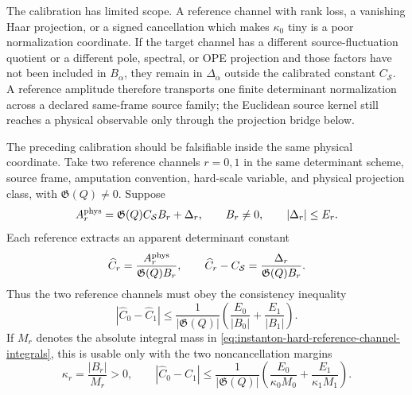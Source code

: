 \begin{controlledapproximation}
The calibration has limited scope.  A reference channel with rank loss, a
vanishing Haar projection, or a signed cancellation which makes \(\kappa_0\)
tiny is a poor normalization coordinate.  If the target channel has a
different source-fluctuation quotient or a different pole, spectral, or OPE
projection and those factors have not been included in \(B_\alpha\), they
remain in \(\Delta_\alpha\) outside the calibrated constant \(C_{\mathcal S}\).
A reference amplitude therefore transports one finite determinant
normalization across a declared same-frame source family; the Euclidean source
kernel still reaches a physical observable only through the projection bridge
below.
\end{controlledapproximation}

\begin{controlledapproximation}
\label{ca:instanton-overdetermined-reference-channel-calibration}
The preceding calibration should be falsifiable inside the same physical
coordinate.  Take two reference channels \(r=0,1\) in the same determinant
scheme, source frame, amputation convention, hard-scale variable, and physical
projection class, with \(\mathfrak G(Q)\ne0\).  Suppose
\begin{equation}
  A_r^{\rm phys}
  =
  \mathfrak G(Q)C_{\mathcal S}B_r+\Delta_r,
  \qquad
  B_r\ne0,\qquad
  |\Delta_r|\le E_r .
  \label{eq:instanton-overdetermined-reference-family}
\end{equation}
Each reference extracts an apparent determinant constant
\begin{equation}
  \widehat C_r
  =
  \frac{A_r^{\rm phys}}{\mathfrak G(Q)B_r},
  \qquad
  \widehat C_r-C_{\mathcal S}
  =
  \frac{\Delta_r}{\mathfrak G(Q)B_r}.
  \label{eq:instanton-reference-extracted-constant}
\end{equation}
Thus the two reference channels must obey the consistency inequality
\begin{equation}
  \left|\widehat C_0-\widehat C_1\right|
  \le
  \frac{1}{|\mathfrak G(Q)|}
  \left(
    \frac{E_0}{|B_0|}
    +
    \frac{E_1}{|B_1|}
  \right).
  \label{eq:instanton-reference-pair-consistency}
\end{equation}
If \(M_r\) denotes the absolute integral mass in
\eqref{eq:instanton-hard-reference-channel-integrals}, this is usable only
with the two noncancellation margins
\begin{equation}
  \kappa_r=\frac{|B_r|}{M_r}>0,
  \qquad
  \left|\widehat C_0-\widehat C_1\right|
  \le
  \frac{1}{|\mathfrak G(Q)|}
  \left(
    \frac{E_0}{\kappa_0M_0}
    +
    \frac{E_1}{\kappa_1M_1}
  \right).
  \label{eq:instanton-reference-margin-bound}
\end{equation}


\end{controlledapproximation}
